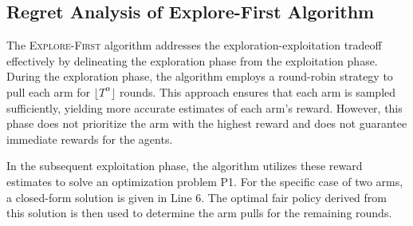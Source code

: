  \iffalse 
\textcolor{red}{TODO: }
 \begin{itemize}
     \item Simulate with different values of $\alpha$ and plot the following
     \begin{itemize}
         \item SW regret for different values of $\alpha$, $T$, and $c$
         \item Fairness regret regret for different values of $\alpha$, $T$, and $c$
         \item The tradeoff and asymptotic optimality 
     \end{itemize}
 \end{itemize}
 \fi 
 
 \subsection{ Regret Analysis of Explore-First Algorithm }
 

\iffalse 
\begin{lemma}
    Under the conditions of Claim \ref{lem:Two} above, we have
    \begin{equation}
    \mathbb{P}( \{ \widehat{a}_{i,2} \geq (1+ \delta) a_{i,2}\} \cap \{ \widehat{a}_{i,1} <  (1+ \delta) a_{i,1}\}) \leq 2 \exp(-n\delta^2 a_{i,1}/2). \end{equation}    \label{lem:Three}
\end{lemma}

\begin{proof}
\textcolor{red}{@Himanshu: complete this proof. }
\end{proof}
\fi 


The \textsc{Explore-First} algorithm addresses the exploration-exploitation tradeoff effectively by delineating the exploration phase from the exploitation phase. During the exploration phase, the algorithm employs a round-robin strategy to pull each arm for $\lfloor T^{\alpha} \rfloor$ rounds. This approach ensures that each arm is sampled sufficiently, yielding more accurate estimates of each arm's reward. However, this phase does not prioritize the arm with the highest reward and does not guarantee immediate rewards for the agents.

In the subsequent exploitation phase, the algorithm utilizes these reward estimates to solve an optimization problem P1. For the specific case of two arms, a closed-form solution is given in Line 6. The optimal fair policy derived from this solution is then used to determine the arm pulls for the remaining rounds.

